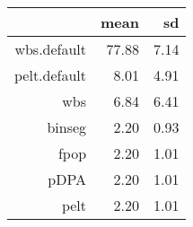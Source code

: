 \begin{tabular}{rrr}
  \hline
 & mean & sd \\ 
  \hline
wbs.default & 77.88 & 7.14 \\ 
  pelt.default & 8.01 & 4.91 \\ 
  wbs & 6.84 & 6.41 \\ 
  binseg & 2.20 & 0.93 \\ 
  fpop & 2.20 & 1.01 \\ 
  pDPA & 2.20 & 1.01 \\ 
  pelt & 2.20 & 1.01 \\ 
   \hline
\end{tabular}
